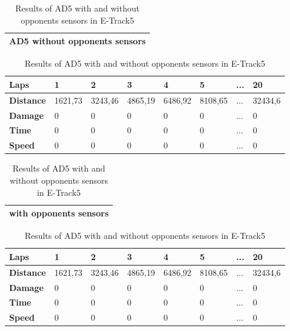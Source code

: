 \documentclass{llncs}
\begin{document}
\begin{table} [h!] 
	
	\caption{Results of AD5 with and without opponents sensors in E-Track5}
	\label{resulta101}
	\begin{tabular}{ |p{12cm}|}
		\hline
		{ \color{red}	\textbf{AD5 without opponents sensors} }
		\\
		\hline
	\end{tabular}
	
	\begin{tabular}{|p{4cm}||p{1cm}||p{1cm}||p{1cm}||p{1cm}||p{1cm}||p{1cm}||p{1cm}|}
		\hline
		\textbf{Laps}&1 & 2& 3& 4&5&... & 20 
		\\
		\hline
		\textbf{Distance}&1621,73&3243,46&4865,19&6486,92&8108,65
		& ...&32434,6 
		\\
		\hline
		\textbf{Damage}&0 &0& 0& 0&0&... &0
		\\
		\hline
		\textbf{Time}&0 &0& 0& 0&0&... &0
		\\
		\hline
		\textbf{Speed}&0 &0& 0& 0&0&... &0
		\\
		\hline
	\end{tabular}
	\begin{tabular}{ |p{12cm}|}
		\hline
		{ \color{red}	\textbf{with opponents sensors}   }
		\\
		\hline
		
	\end{tabular}
	
	\begin{tabular}{|p{4cm}||p{1cm}||p{1cm}||p{1cm}||p{1cm}||p{1cm}||p{1cm}||p{1cm}|}
		\hline
		\textbf{Laps}&1 & 2& 3& 4&5&... & 20 
		\\
		\hline
		\textbf{Distance}&1621,73&3243,46&4865,19&6486,92&8108,65
		& ...&32434,6  
		\\
		\hline
		\textbf{Damage}&0 &0& 0& 0&0&... &0
		\\
		\hline
		\textbf{Time}&0 &0& 0& 0&0&... &0
		\\
		\hline
		\textbf{Speed}&0 &0& 0& 0&0&... &0
		\\
		\hline
	\end{tabular}
\end{table}
\newpage
%
%		

\end{document}
